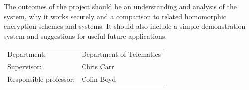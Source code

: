 \documentclass[a4paper,11pt]{article}
\begin{document}
\begin{titlepage}
The outcomes of the project should be an understanding and analysis of the system, why it works securely and a comparison to related homomorphic encryption schemes and systems. It should also include a simple demonstration system and suggestions for useful future applications.\\

\begin{tabular}{@{}p{5cm}l}
Department:		& Department of Telematics \\
Supervisor:		& Chris Carr \\
Responsible professor: 	& Colin Boyd \\
\end{tabular}

\end{titlepage}
\end{document}
